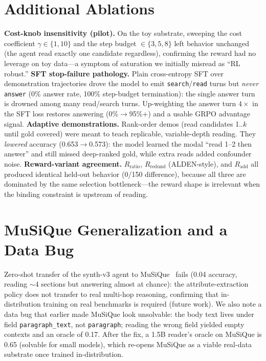 \documentclass[10pt,twocolumn]{article}
\begin{document}
\section{Additional Ablations}
\label{app:ablations}
\textbf{Cost-knob insensitivity (pilot).} On the toy substrate, sweeping the cost coefficient $\gamma\in\{1,10\}$ and the step budget $\in\{3,5,8\}$ left behavior unchanged (the agent read exactly one candidate regardless), confirming the reward had no leverage on toy data---a symptom of saturation we initially misread as ``RL robust.''
\textbf{SFT stop-failure pathology.} Plain cross-entropy SFT over demonstration trajectories drove the model to emit \texttt{search}/\texttt{read} turns but \emph{never} \texttt{answer} (0\% answer rate, 100\% step-budget termination): the single answer turn is drowned among many read/search turns. Up-weighting the answer turn $4\times$ in the SFT loss restores answering (0\%$\to$95\%+) and a usable GRPO advantage signal.
\textbf{Adaptive demonstrations.} Rank-order demos (read candidates 1..$k$ until gold covered) were meant to teach replicable, variable-depth reading. They \emph{lowered} accuracy (0.653$\to$0.573): the model learned the modal ``read 1--2 then answer'' and still missed deep-ranked gold, while extra reads added confounder noise.
\textbf{Reward-variant agreement.} $R_{\text{ratio}}$, $R_{\text{redund}}$ (ALDEN-style), and $R_{\text{add}}$ all produced identical held-out behavior (0/150 difference), because all three are dominated by the same selection bottleneck---the reward shape is irrelevant when the binding constraint is upstream of reading.

\section{MuSiQue Generalization and a Data Bug}
\label{app:musique}
Zero-shot transfer of the synth-v3 agent to MuSiQue~\cite{musique} fails (0.04 accuracy, reading $\sim$4 sections but answering almost at chance): the attribute-extraction policy does not transfer to real multi-hop reasoning, confirming that in-distribution training on real benchmarks is required (future work). We also note a data bug that earlier made MuSiQue look unsolvable: the body text lives under field \texttt{paragraph\_text}, not \texttt{paragraph}; reading the wrong field yielded empty contexts and an oracle of 0.17. After the fix, a 1.5B reader's oracle on MuSiQue is 0.65 (solvable for small models), which re-opens MuSiQue as a viable real-data substrate once trained in-distribution.
\end{document}
